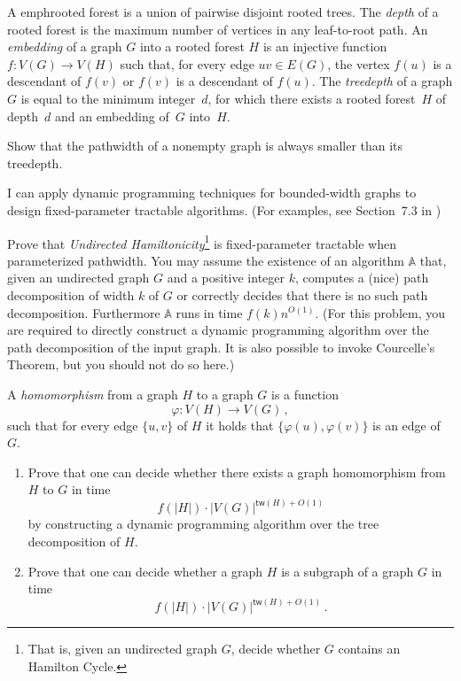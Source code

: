 \documentclass{uebung_cs}
\begin{document}
\begin{exercise}[Treedepth][\hard]
  A emph{rooted forest} is a union of pairwise disjoint rooted trees. The \emph{depth} of a rooted forest is the maximum number of vertices in any leaf-to-root path. An \emph{embedding} of a graph $G$ into a rooted forest $H$ is an injective function $f \colon V (G) \rightarrow V(H)$ such that, for every edge $uv \in E(G)$, the vertex $f(u)$ is a descendant of $f(v)$ or $f(v)$ is a descendant of $f(u)$. The \emph{treedepth} of a graph $G$ is equal to the minimum integer~$d$, for which there exists a rooted forest~$H$ of depth~$d$ and an embedding of~$G$ into~$H$.

  Show that the pathwidth of a nonempty graph is always smaller than its treedepth.
\end{exercise}

\newpage
\begin{skill}
  I can apply dynamic programming techniques for bounded-width graphs to design fixed-parameter tractable algorithms. \normalfont (For examples, see Section~7.3 in \cygan{})
\end{skill}

\begin{exercise}
  Prove that \emph{Undirected Hamiltonicity}\footnote{That is, given an undirected graph $G$, decide whether $G$ contains an Hamilton Cycle.} is fixed-parameter tractable when parameterized pathwidth. You may assume the existence of an algorithm $\mathbb{A}$ that, given an undirected graph $G$ and a positive integer $k$, computes a (nice) path decomposition of width $k$ of $G$ or correctly decides that there is no such path decomposition. Furthermore $\mathbb{A}$ runs in time $f(k) n^{O(1)}$. (For this problem, you are required to directly construct a dynamic programming algorithm over the path decomposition of the input graph. It is also possible to invoke Courcelle's Theorem, but you should not do so here.)
\end{exercise}

\begin{exercise}%
  A \emph{homomorphism} from a graph $H$ to a graph $G$ is a function \[\varphi:V(H)\rightarrow V(G) \,, \] such that for every edge $\{u,v\}$ of $H$ it holds that $\{\varphi(u),\varphi(v)\}$ is an edge of $G$.
  \begin{enumerate}
    \item Prove that one can decide whether there exists a graph homomorphism from $H$ to $G$ in time
          \[f(|H|)\cdot |V(G)|^{\mathsf{tw}(H)+O(1)} \]
          by constructing a dynamic programming algorithm over the tree decomposition of $H$.
    \item Prove that one can decide whether a graph $H$ is a subgraph of a graph $G$ in time
          \[f(|H|)\cdot |V(G)|^{\mathsf{tw}(H)+O(1)} \,.\]
  \end{enumerate}
\end{exercise}
\end{document}
